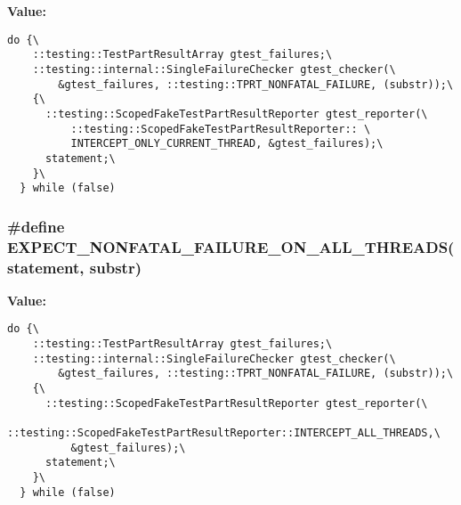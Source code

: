 \textbf{Value:}

\begin{Code}\begin{verbatim}do {\
    ::testing::TestPartResultArray gtest_failures;\
    ::testing::internal::SingleFailureChecker gtest_checker(\
        &gtest_failures, ::testing::TPRT_NONFATAL_FAILURE, (substr));\
    {\
      ::testing::ScopedFakeTestPartResultReporter gtest_reporter(\
          ::testing::ScopedFakeTestPartResultReporter:: \
          INTERCEPT_ONLY_CURRENT_THREAD, &gtest_failures);\
      statement;\
    }\
  } while (false)
\end{verbatim}
\end{Code}
\subsubsection{\setlength{\rightskip}{0pt plus 5cm}\#define EXPECT\_\-NONFATAL\_\-FAILURE\_\-ON\_\-ALL\_\-THREADS(statement, substr)}\label{gtest-spi_8h_caebbbbeb2751c3cb027ad57a9546257}


\textbf{Value:}

\begin{Code}\begin{verbatim}do {\
    ::testing::TestPartResultArray gtest_failures;\
    ::testing::internal::SingleFailureChecker gtest_checker(\
        &gtest_failures, ::testing::TPRT_NONFATAL_FAILURE, (substr));\
    {\
      ::testing::ScopedFakeTestPartResultReporter gtest_reporter(\
          ::testing::ScopedFakeTestPartResultReporter::INTERCEPT_ALL_THREADS,\
          &gtest_failures);\
      statement;\
    }\
  } while (false)
\end{verbatim}
\end{Code}
